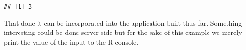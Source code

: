 \documentclass[
]{krantz}
\makeatletter
\newenvironment{Shaded}{\begin{snugshade}}{\end{snugshade}}
\newcommand{\ControlFlowTok}[1]{\textcolor[rgb]{0.27,0.27,0.27}{\textbf{#1}}}
\newcommand{\DataTypeTok}[1]{\textcolor[rgb]{0.27,0.27,0.27}{#1}}
\newcommand{\DecValTok}[1]{\textcolor[rgb]{0.06,0.06,0.06}{#1}}
\newcommand{\KeywordTok}[1]{\textcolor[rgb]{0.27,0.27,0.27}{\textbf{#1}}}
\newcommand{\NormalTok}[1]{#1}
\newcommand{\OperatorTok}[1]{\textcolor[rgb]{0.43,0.43,0.43}{\textbf{#1}}}
\newcommand{\StringTok}[1]{\textcolor[rgb]{0.5,0.5,0.5}{#1}}
\newenvironment{kframe}{%
\medskip{}
\setlength{\fboxsep}{.8em}
 \def\at@end@of@kframe{}%
 \ifinner\ifhmode%
  \def\at@end@of@kframe{\end{minipage}}%
  \begin{minipage}{\columnwidth}%
 \fi\fi%
 \def\FrameCommand##1{\hskip\@totalleftmargin \hskip-\fboxsep
 \colorbox{shadecolor}{##1}\hskip-\fboxsep
     \hskip-\linewidth \hskip-\@totalleftmargin \hskip\columnwidth}%
 \MakeFramed {\advance\hsize-\width
   \@totalleftmargin\z@ \linewidth\hsize
   \@setminipage}}%
 {\par\unskip\endMakeFramed%
 \at@end@of@kframe}
\renewenvironment{Shaded}{\begin{kframe}}{\end{kframe}}
\makeatother
\begin{document}
\begin{Shaded}
\end{Shaded}

\begin{verbatim}
## [1] 3
\end{verbatim}

That done it can be incorporated into the application built thus far. Something interesting could be done server-side but for the sake of this example we merely print the value of the input to the R console.
\end{document}
